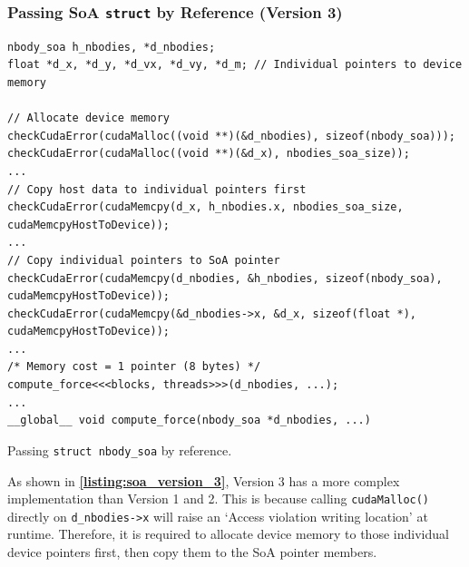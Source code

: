 \documentclass[12pt, a4paper]{article}
\let\oldcref\cref
\renewcommand{\cref}[1]{\textbf{\oldcref{#1}}}
\begin{document}
\subsubsection{Passing SoA \texorpdfstring{\texttt{struct}}{} by Reference (Version 3)} \label{subsubsec:soa_struct_by_reference}

\begin{listing}[H]
  \begin{verbatim}
nbody_soa h_nbodies, *d_nbodies;
float *d_x, *d_y, *d_vx, *d_vy, *d_m; // Individual pointers to device memory

// Allocate device memory
checkCudaError(cudaMalloc((void **)(&d_nbodies), sizeof(nbody_soa)));
checkCudaError(cudaMalloc((void **)(&d_x), nbodies_soa_size));
...
// Copy host data to individual pointers first
checkCudaError(cudaMemcpy(d_x, h_nbodies.x, nbodies_soa_size, cudaMemcpyHostToDevice));
...
// Copy individual pointers to SoA pointer
checkCudaError(cudaMemcpy(d_nbodies, &h_nbodies, sizeof(nbody_soa), cudaMemcpyHostToDevice));
checkCudaError(cudaMemcpy(&d_nbodies->x, &d_x, sizeof(float *), cudaMemcpyHostToDevice));
...
/* Memory cost = 1 pointer (8 bytes) */
compute_force<<<blocks, threads>>>(d_nbodies, ...);
...
__global__ void compute_force(nbody_soa *d_nbodies, ...)
  \end{verbatim}
  \caption{Passing \texttt{struct nbody_soa} by reference.}
  \label{listing:soa_version_3}
\end{listing}

As shown in \cref{listing:soa_version_3}, Version 3 has a more complex implementation than Version 1
and 2. This is because calling \texttt{cudaMalloc()} directly on \texttt{d\_nbodies->x}
will raise an `Access violation writing location' at runtime. Therefore, it is required to allocate
device memory to those individual device pointers first, then copy them to the SoA pointer members.
\end{document}
